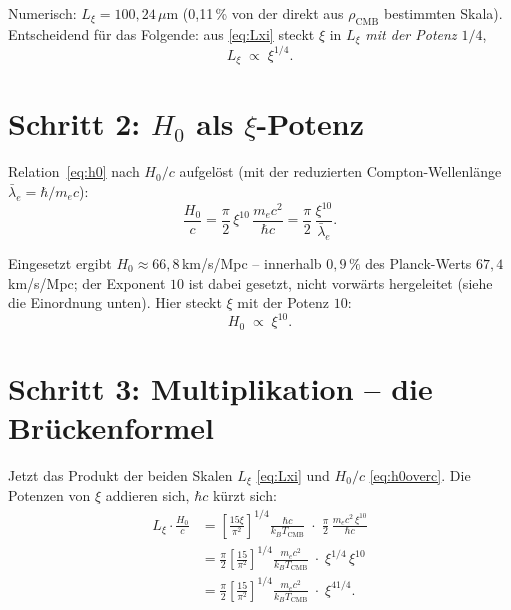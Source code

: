 \begin{keyresult}
Numerisch: $L_\xi = 100{,}24\,\mu$m (0,11\,\% von der direkt aus
$\rho_\text{CMB}$ bestimmten Skala). Entscheidend für das Folgende: aus
\eqref{eq:Lxi} steckt $\xi$ in $L_\xi$ \emph{mit der Potenz $1/4$},
\[
  L_\xi \;\propto\; \xi^{1/4}.
\]
\end{keyresult}

\section{Schritt 2: $H_0$ als $\xi$-Potenz}

Relation~\eqref{eq:h0} nach $H_0/c$ aufgelöst (mit der reduzierten
Compton-Wellenlänge $\bar\lambda_e=\hbar/m_ec$):
\begin{equation}
  \frac{H_0}{c} = \frac{\pi}{2}\,\xi^{10}\,\frac{m_e c^2}{\hbar c}
  = \frac{\pi}{2}\,\frac{\xi^{10}}{\bar\lambda_e}.
  \label{eq:h0overc}
\end{equation}

\begin{keyresult}[H$_0$-Exponent $10$]
Eingesetzt ergibt $H_0 \approx 66{,}8$\,km/s/Mpc -- innerhalb $0{,}9\,\%$ des
Planck-Werts $67{,}4$\,km/s/Mpc; der Exponent $10$ ist dabei gesetzt, nicht
vorwärts hergeleitet (siehe die Einordnung unten). Hier steckt $\xi$ mit
der Potenz $10$:
\[
  H_0 \;\propto\; \xi^{10}.
\]
\end{keyresult}

\section{Schritt 3: Multiplikation -- die Brückenformel}

Jetzt das Produkt der beiden Skalen $L_\xi$ \eqref{eq:Lxi} und $H_0/c$
\eqref{eq:h0overc}. Die Potenzen von $\xi$ addieren sich, $\hbar c$ kürzt sich:
\begin{align}
  L_\xi\cdot\frac{H_0}{c}
  &= \left[\frac{15\xi}{\pi^2}\right]^{1/4}\frac{\hbar c}{k_BT_\text{CMB}}
     \;\cdot\; \frac{\pi}{2}\,\frac{m_ec^2\,\xi^{10}}{\hbar c}
     \nonumber\\[4pt]
  &= \frac{\pi}{2}\left[\frac{15}{\pi^2}\right]^{1/4}
     \frac{m_ec^2}{k_BT_\text{CMB}}\;\cdot\;\xi^{1/4}\,\xi^{10}
     \nonumber\\[4pt]
  &= \frac{\pi}{2}\left[\frac{15}{\pi^2}\right]^{1/4}
     \frac{m_ec^2}{k_BT_\text{CMB}}\;\cdot\;\xi^{41/4}.
  \label{eq:bridgederiv}
\end{align}

